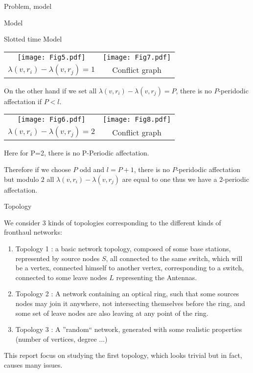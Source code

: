 \documentclass[a4paper,10pt]{report}
\begin{document}
\begin{chapter}{Problem, model}
\begin{section}{Model}
\begin{subsection}{Slotted time Model}
{{\begin{tabular}{cc}
\texttt{[image: Fig5.pdf]} & \texttt{[image: Fig7.pdf]}\\
 $\lambda(v,r_i) - \lambda(v,r_j)=1$ & Conflict graph\\
\end{tabular}\newline

On the other hand if we set all $\lambda(v,r_i) - \lambda(v,r_j)=P$, there is no $P$-peridodic affectation if $P<l$.

\begin{tabular}{cc}
\texttt{[image: Fig6.pdf]} & \texttt{[image: Fig8.pdf]}\\
 $\lambda(v,r_i) - \lambda(v,r_j)=2$ & Conflict graph\\
\end{tabular}\newline
\begin{center}
 Here for P=2, there is no P-Periodic affectation.
\end{center}

Therefore if we choose $P$ odd and $l=P+1$, there is no $P$-peridodic affectation but modulo $2$ all $\lambda(v,r_i) - \lambda(v,r_j)$
are equal to one thus we have a $2$-periodic affectation. 
}}
\end{subsection}
\begin{subsection}{Topology}

We consider 3 kinds of topologies corresponding to the different kinds of fronthaul networks: 
\begin{enumerate}
 \item Topology 1 : a basic network topology, composed of some base stations, represented by source nodes $S$, all connected to the same switch,
which will be a vertex, connected himself to another vertex, corresponding to a switch, connected to some leave nodes $L$ representing the Antennas.
\item Topology 2 : A network containing an optical ring, such that some sources nodes may join it anywhere, not intersecting themselves before the ring,
and some set of leave nodes are also leaving at any point of the ring.
\item Topology 3 : A ''random`` network, generated with some realistic properties (number of vertices, degree ...)
\end{enumerate}

This report focus on studying the first topology, which looks trivial but in fact, causes many issues.


\end{subsection}
\end{section}
\end{chapter}
\end{document}
